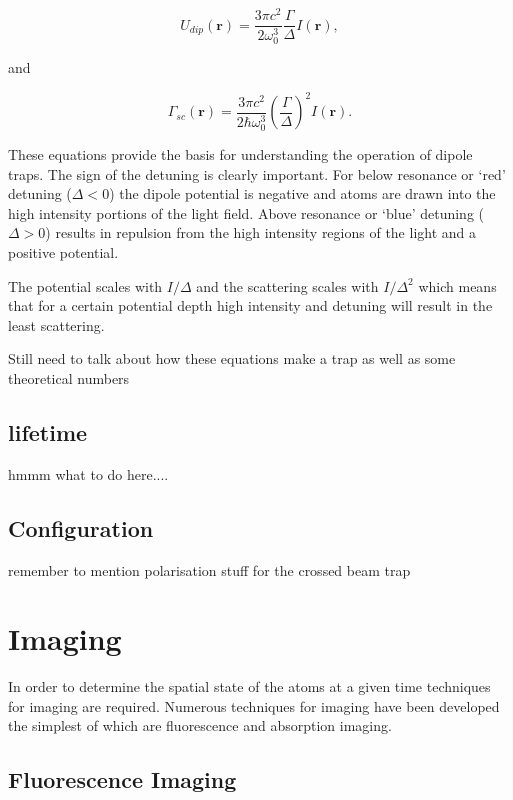 \begin{equation}\label{eq:simple_potential}
U_{dip}(\boldsymbol{r}) = \frac{3\pi c^2}{2 \omega_0^3} \frac{\Gamma}{\Delta} I(\boldsymbol{r}),
\end{equation}

and

\begin{equation}\label{eq:simple_scattering}
\Gamma_{sc} (\boldsymbol r ) = \frac{3\pi c^2}{2\hbar\omega_0^3} \left( \frac{\Gamma}{\Delta} \right)^2 I(\boldsymbol r ).
\end{equation}

These equations provide the basis for understanding the operation of dipole traps. The sign of the detuning is clearly important. For below resonance or `red' detuning ($\Delta < 0$) the dipole potential is negative and atoms are drawn into the high intensity portions of the light field. Above resonance or `blue' detuning ($\Delta > 0$) results in repulsion from the high intensity regions of the light and a positive potential.

The potential scales with $I/\Delta$ and the scattering scales with $I/\Delta^2$ which means that for a certain potential depth high intensity and detuning will result in the least scattering.

{\color{red} Still need to talk about how these equations make a trap as well as some theoretical numbers}

\subsection{lifetime}

{\color{red} hmmm what to do here....}

\subsection{Configuration}

remember to mention polarisation stuff for the crossed beam trap

\section{Imaging}

In order to determine the spatial state of the atoms at a given time techniques for imaging are required. Numerous techniques for imaging have been developed the simplest of which are fluorescence and absorption imaging.

\subsection{Fluorescence Imaging}

